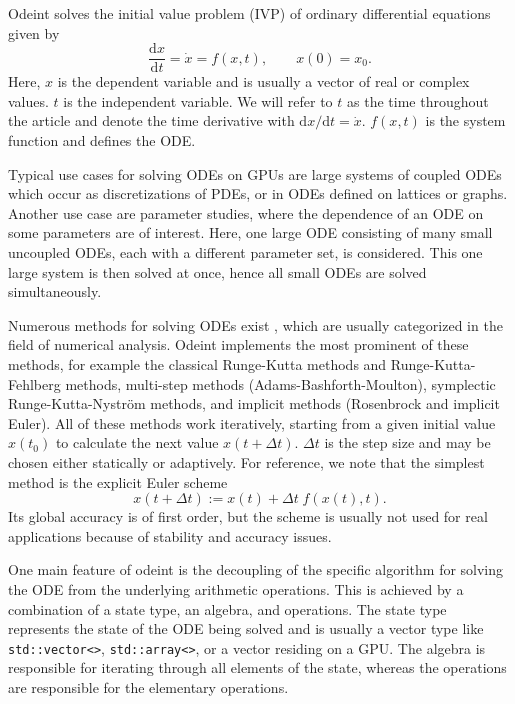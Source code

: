 \documentclass[final]{siamltex}
\newcommand{\code}[1]{\lstinline|#1|}
\newcommand {\de} {\mbox{d}}
\begin{document}
Odeint solves the initial value problem (IVP) of ordinary differential
equations given by
\begin{equation}
\frac{\de x}{\de t } = \dot{x} = f(x , t), \quad \quad x(0) = x_0.
\label{eq:ode}
\end{equation}
Here, $x$ is the dependent variable and is usually a vector of real or complex
values.  $t$ is the independent variable. We will refer to $t$ as the time
throughout the article and denote the time derivative with $\de x / \de t =
\dot{x}$. $f(x,t)$ is the system function and defines the ODE.

Typical use cases for solving ODEs on GPUs are large systems of coupled ODEs
which occur as discretizations of PDEs, or in ODEs defined on lattices or
graphs. Another use case are parameter studies, where the
dependence of an ODE on some parameters are of interest. Here, one large ODE 
consisting of many small uncoupled ODEs, each with a different parameter set, is considered.
This one large system is then solved at once, hence all small ODEs are solved
simultaneously.


Numerous methods for solving ODEs exist \cite{Press-92,HairerSolvingODEI,
HairerSolvingODEII}, which are usually categorized in the field of numerical
analysis.  Odeint implements the most prominent of these methods, for example
the classical Runge-Kutta methods and Runge-Kutta-Fehlberg methods, multi-step
methods (Adams-Bashforth-Moulton), symplectic Runge-Kutta-Nystr\"om methods,
and implicit methods (Rosenbrock and implicit Euler). All of these methods work
iteratively, starting from a given initial value $x(t_0)$ to calculate the next
value $x(t+\Delta t)$.  $\Delta t$ is the step size and may be chosen either
statically or adaptively.  For reference, we note that the simplest method is
the explicit Euler scheme
\begin{equation}
x\left(t+\Delta t\right) := x(t) + \Delta t \; f(x(t),t) .
\label{eq:euler}
\end{equation}
Its global accuracy is of first order, but the scheme is usually not
used for real applications because of stability and accuracy issues.


One main feature of odeint is the decoupling of the specific algorithm
for solving the ODE from the underlying arithmetic operations. This
is achieved by a combination of a state type, an algebra, and
operations. The state type represents the state of the ODE being
solved and is usually a vector type like \code{std::vector<>},
\code{std::array<>}, or a vector residing on a GPU. The algebra is
responsible for iterating through all elements of the state, whereas
the operations are responsible for the elementary operations.
\end{document}
